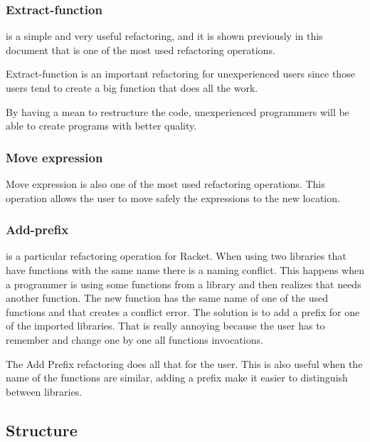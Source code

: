\subsubsection{Extract-function}

is a simple and very useful refactoring, and it is shown previously in this document that is one of the most used refactoring operations.

Extract-function is an important refactoring for unexperienced users since those users tend to create a big function that does all the work.

By having a mean to restructure the code, unexperienced programmers will be able to create programs with better quality.




\subsubsection{Move expression}

Move expression is also one of the most used refactoring operations.
This operation allows the user to move safely the expressions to the new location.



\subsubsection{Add-prefix}
is a particular refactoring operation for Racket.
When using two libraries that have functions with the same name there is a naming conflict.
This happens when a programmer is using some functions from a library and then realizes that needs another function.
The new function has the same name of one of the used functions and that creates a conflict error.
The solution is to add a prefix for one of the imported libraries.
That is really annoying because the user has to remember and change one by one all functions invocations.

The Add Prefix refactoring does all that for the user.
This is also useful when the name of the functions are similar, adding a prefix make it easier to distinguish between libraries.





\subsection{Structure}

